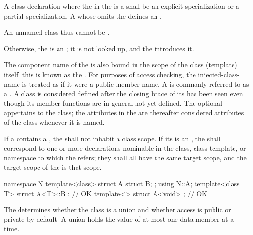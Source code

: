 A class declaration where the 
in the  is a 
shall be an explicit specialization or
a partial specialization.
A  whose
 omits the
 defines an .
\begin{note}
An unnamed class thus cannot
be .
\end{note}
Otherwise, the  is an ;
it is not looked up, and the  introduces it.

\pnum
{}%
The component name of the
 is also bound in the scope of the class (template)
itself; this is known as the .
For purposes of access checking, the injected-class-name is treated as
if it were a public member name.
A  is commonly referred to as a .
A class is considered defined after the closing brace of its
 has been seen even though its member
functions are in general not yet defined.
The optional  appertains to the class; the attributes in
the  are thereafter considered attributes of the class
whenever it is named.

\pnum
If a  contains a ,
the  shall not inhabit a class scope.
If its  is an ,
the  shall correspond to
one or more declarations nominable in
the class, class template, or namespace to which the
 refers;
they shall all have the same target scope, and the target scope of the
 is that scope.
\begin{example}
\begin{codeblock}
namespace N {
  template<class>
  struct A {
    struct B;
  };
}
using N::A;
template<class T> struct A<T>::B {};    // OK
template<> struct A<void> {};           // OK
\end{codeblock}
\end{example}

\pnum
\begin{note}
The  determines
whether the class is a union and
whether access is public or private by default.
A union holds the value of at most one data member at a time.
\end{note}

